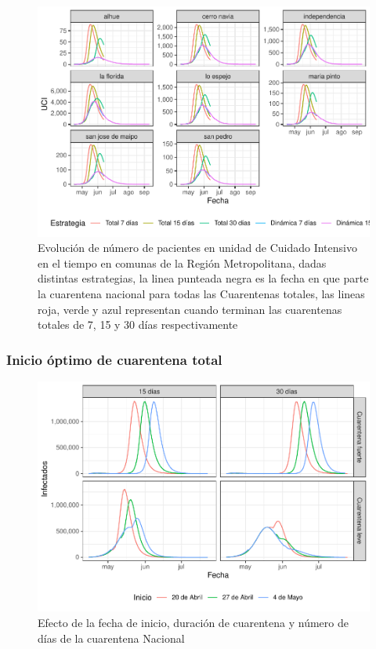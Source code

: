 \documentclass[]{article}
\begin{document}
\begin{figure}
\centering
\includegraphics{Informe_Mesa_2020_04_16_files/figure-latex/UCIComunal-1.pdf}
\caption{\label{fig:UCIComunal}Evolución de número de pacientes en unidad de Cuidado Intensivo en el tiempo en comunas de la Región Metropolitana, dadas distintas estrategias, la linea punteada negra es la fecha en que parte la cuarentena nacional para todas las Cuarentenas totales, las lineas roja, verde y azul representan cuando terminan las cuarentenas totales de 7, 15 y 30 días respectivamente}
\end{figure}

\hypertarget{inicio-uxf3ptimo-de-cuarentena-total}{%
\subsubsection{Inicio óptimo de cuarentena total}\label{inicio-uxf3ptimo-de-cuarentena-total}}

\begin{figure}
\centering
\includegraphics{Informe_Mesa_2020_04_16_files/figure-latex/InicioDuracion-1.pdf}
\caption{\label{fig:InicioDuracion}Efecto de la fecha de inicio, duración de cuarentena y número de días de la cuarentena Nacional}
\end{figure}
\end{document}
